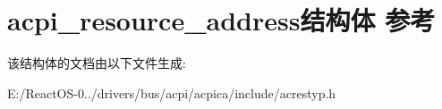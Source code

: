 \hypertarget{structacpi__resource__address}{}\section{acpi\+\_\+resource\+\_\+address结构体 参考}
\label{structacpi__resource__address}


该结构体的文档由以下文件生成\+:\begin{DoxyCompactItemize}
\item 
E\+:/\+React\+O\+S-\/0../drivers/bus/acpi/acpica/include/acrestyp.\+h\end{DoxyCompactItemize}
